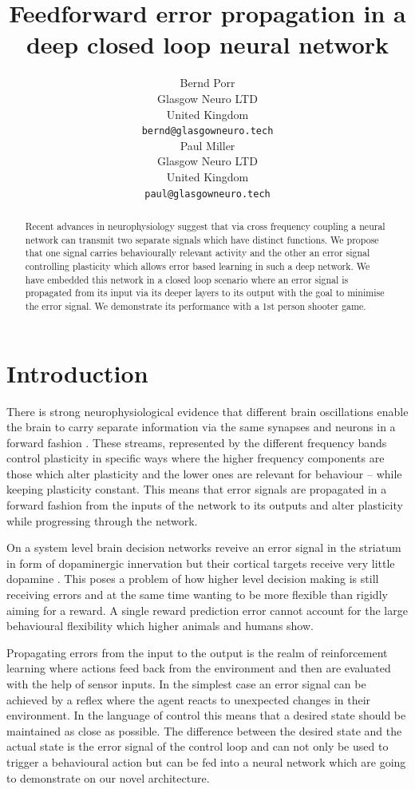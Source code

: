 \documentclass{article}
\title{Feedforward error propagation in a deep closed loop neural network}
\author{
  Bernd Porr\\
  Glasgow Neuro LTD\\
  United Kingdom\\
  \texttt{bernd@glasgowneuro.tech} \\
  Paul Miller \\
  Glasgow Neuro LTD \\
  United Kingdom \\
  \texttt{paul@glasgowneuro.tech}
}
\begin{document}
\maketitle

\begin{abstract}
  Recent advances in neurophysiology suggest that via cross frequency
  coupling a neural network can transmit two separate signals which
  have distinct functions. We propose that one signal carries
  behaviourally relevant activity and the other an error signal
  controlling plasticity which allows error based learning in such a
  deep network. We have embedded this network in a closed loop
  scenario where an error signal is propagated from its input via its
  deeper layers to its output with the goal to minimise the error
  signal. We demonstrate its performance with a 1st person shooter
  game.
\end{abstract}

\section{Introduction}
There is strong neurophysiological evidence that different brain
oscillations enable the brain to carry separate information via the
same synapses and neurons in a forward fashion
\cite{Canolty2010}. These streams, represented by the different
frequency bands control plasticity in specific ways where the higher
frequency components are those which alter plasticity \cite{Bliss73}
and the lower ones are relevant for behaviour \cite{Luescher2012} --
while keeping plasticity constant. This means that error signals are
propagated in a forward fashion from the inputs of the network to its
outputs and alter plasticity while progressing through the network.

On a system level brain decision networks reveive an error signal in
the striatum in form of dopaminergic innervation \cite{Schultz97} but
their cortical targets receive very little dopamine
\cite{Groenewegen1993}. This poses a problem of how higher level
decision making is still receiving errors and at the same time wanting
to be more flexible than rigidly aiming for a reward. A single
reward prediction error cannot account for the large behavioural
flexibility which higher animals and humans show.

Propagating errors from the input to the output is the realm of
reinforcement learning where actions feed back from the environment
and then are evaluated with the help of sensor
inputs\cite{Verschure91,Dayan1992,Sutton88,Sutton98,PorrNecoInvco2003,Woergoetter2005}. In
the simplest case an error signal can be achieved by a reflex
\cite{Verschure91,PorrNecoInvco2003} where the agent reacts to
unexpected changes in their environment. In the language of control
\cite{Phillips2000} this means that a desired state should be
maintained as close as possible. The difference between the desired
state and the actual state is the error signal of the control loop and
can not only be used to trigger a behavioural action but can be fed
into a neural network which are going to demonstrate on our novel
architecture.
\end{document}
